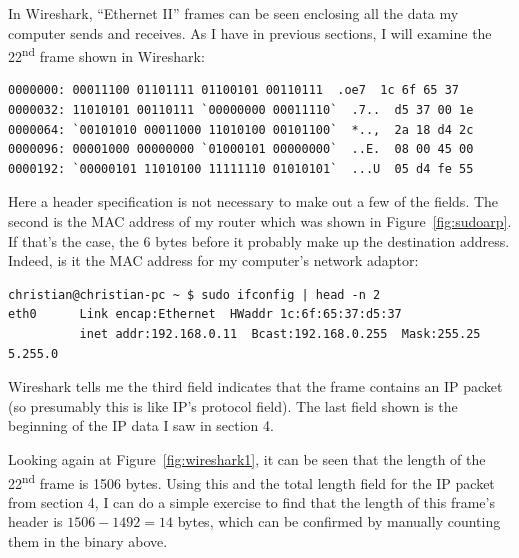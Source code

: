 \documentclass[11pt,a4paper]{report}
\begin{document}
	In Wireshark, ``Ethernet II'' frames can be seen enclosing all the data my computer sends and receives. As I have in previous sections, I will examine the 22\textsuperscript{nd} frame shown in Wireshark:
	{
		\setlength\topsep{0pt}
		\setlength\parskip{0pt}
		\begin{center}
		\begin{minipage}{0.94505\textwidth}
		\begin{lstlisting}[style=highlightable, frame=none, numbers=none, xleftmargin=0ex, xrightmargin=0ex]
0000000: 00011100 01101111 01100101 00110111  .oe7  1c 6f 65 37
0000032: 11010101 00110111 `00000000 00011110`  .7..  d5 37 00 1e
0000064: `00101010 00011000 11010100 00101100`  *..,  2a 18 d4 2c
0000096: 00001000 00000000 `01000101 00000000`  ..E.  08 00 45 00
0000192: `00000101 11010100 11111110 01010101`  ...U  05 d4 fe 55
		\end{lstlisting}
		\end{minipage}
		\end{center}
	}\noindent
	Here a header specification is not necessary to make out a few of the fields. The second is the MAC address of my router which was shown in Figure~\ref{fig:sudoarp}. If that's the case, the 6 bytes before it probably make up the destination address. Indeed, is it the MAC address for my computer's network adaptor:
	{
		\setlength\topsep{0pt}
		\setlength\parskip{0pt}
		\begin{center}
		\begin{minipage}{\textwidth}
		\begin{lstlisting}[style=highlightable, frame=none, numbers=none, xleftmargin=0ex, xrightmargin=0ex]
christian@christian-pc ~ $ sudo ifconfig | head -n 2
eth0      Link encap:Ethernet  HWaddr 1c:6f:65:37:d5:37  
          inet addr:192.168.0.11  Bcast:192.168.0.255  Mask:255.25
5.255.0
		\end{lstlisting}
		\end{minipage}
		\end{center}
	}\noindent
	Wireshark tells me the third field indicates that the frame contains an IP packet (so presumably this is like IP's protocol field). The last field shown is the beginning of the IP data I saw in section 4.
	
	Looking again at Figure~\ref{fig:wireshark1}, it can be seen that the length of the 22\textsuperscript{nd} frame is 1506 bytes. Using this and the total length field for the IP packet from section 4, I can do a simple exercise to find that the length of this frame's header is $1506 - 1492 = 14$ bytes, which can be confirmed by manually counting them in the binary above.
	
\end{document}
